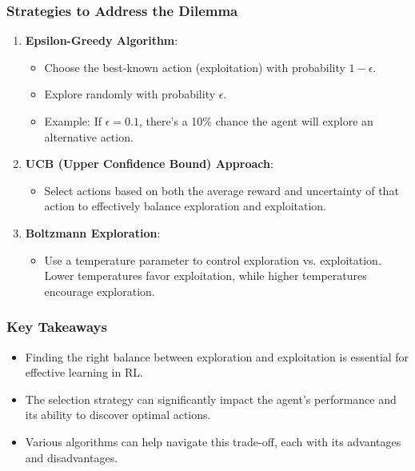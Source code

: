 \documentclass[aspectratio=169]{beamer}
\begin{document}
\begin{frame}[fragile]
    \frametitle{Strategies to Address the Dilemma}
    \begin{enumerate}
        \item \textbf{Epsilon-Greedy Algorithm}:
        \begin{itemize}
            \item Choose the best-known action (exploitation) with probability \( 1 - \epsilon \).
            \item Explore randomly with probability \( \epsilon \).
            \item Example: If \( \epsilon = 0.1 \), there's a 10\% chance the agent will explore an alternative action.
        \end{itemize}
        
        \item \textbf{UCB (Upper Confidence Bound) Approach}:
        \begin{itemize}
            \item Select actions based on both the average reward and uncertainty of that action to effectively balance exploration and exploitation.
        \end{itemize}
        
        \item \textbf{Boltzmann Exploration}:
        \begin{itemize}
            \item Use a temperature parameter to control exploration vs. exploitation. Lower temperatures favor exploitation, while higher temperatures encourage exploration.
        \end{itemize}
    \end{enumerate}
\end{frame}

\begin{frame}[fragile]
    \frametitle{Key Takeaways}
    \begin{itemize}
        \item Finding the right balance between exploration and exploitation is essential for effective learning in RL.
        \item The selection strategy can significantly impact the agent's performance and its ability to discover optimal actions.
        \item Various algorithms can help navigate this trade-off, each with its advantages and disadvantages.
    \end{itemize}
\end{frame}
\end{document}
